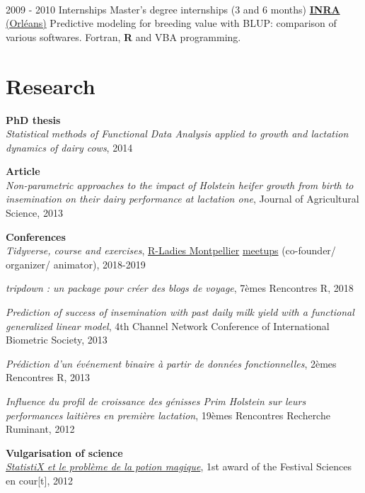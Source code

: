 \documentclass[letterpaper]{twentysecondcv} %
\begin{document}
\begin{twenty}
{        }
     \\
     \twentyitem
   		{2009 - 2010}
		{Internships}
        {Master's degree internships \textnormal{(3 and 6 months)}}
        {\href{https://www6.val-de-loire.inra.fr/biofora}{\textbf{INRA} (Orléans)}}
        {}
        {Predictive modeling for breeding value with BLUP: comparison of various softwares. Fortran, \textbf{R} and VBA programming.
    	}
        
\end{twenty}

\vspace{5mm} 

\section{Research}
\textbf{PhD thesis} \\ 
\textit{Statistical methods of Functional Data Analysis applied to growth and lactation dynamics of dairy cows}, 2014

\textbf{Article} \\ 
\textit{Non-parametric approaches to the impact of Holstein heifer growth from birth to insemination on their dairy performance at lactation one}, Journal of Agricultural Science,  2013 

\textbf{Conferences} \\ 
\textit{Tidyverse, course and exercises}, \href{https://twitter.com/RLadiesMontpel}{R-Ladies Montpellier} \href{https://www.meetup.com/fr-FR/rladies-montpellier/}{meetups} (co-founder/ organizer/ animator), 2018-2019

\textit{tripdown : un package pour créer des blogs de voyage}, 7èmes Rencontres R, 2018

\textit{Prediction of success of insemination with past daily milk yield with a functional generalized linear model}, 4th Channel Network Conference of International Biometric Society, 2013

\textit{Prédiction d'un événement binaire à partir de données fonctionnelles}, 2èmes Rencontres R, 2013

\textit{Influence du profil de croissance des génisses Prim Holstein sur leurs performances laitières en première
lactation}, 19èmes Rencontres Recherche Ruminant, 2012 

\textbf{Vulgarisation of science}\\
\href{https://www.youtube.com/watch?v=QAT0F__A258}{\textit{StatistiX et le problème de la potion magique}}, 1st award of the Festival Sciences en cour[t], 2012
\end{document}
